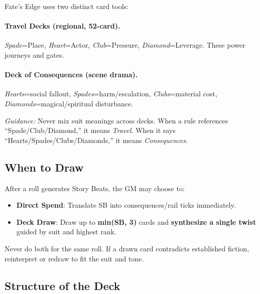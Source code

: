 Fate's Edge uses two distinct card tools:

\paragraph{Travel Decks (regional, 52-card).}
\emph{Spade}=Place, \emph{Heart}=Actor, \emph{Club}=Pressure, \emph{Diamond}=Leverage. These power journeys and gates.

\paragraph{Deck of Consequences (scene drama).}
\emph{Hearts}=social fallout, \emph{Spades}=harm/escalation, \emph{Clubs}=material cost, \emph{Diamonds}=magical/spiritual disturbance.

\textit{Guidance:} Never mix suit meanings across decks. When a rule references ``Spade/Club/Diamond,'' it means \emph{Travel}. When it says ``Hearts/Spades/Clubs/Diamonds,'' it means \emph{Consequences}.

\subsection*{When to Draw}

After a roll generates Story Beats, the GM may choose to:

\begin{itemize}
    \item \textbf{Direct Spend}: Translate SB into consequences/rail ticks immediately.
    \item \textbf{Deck Draw}: Draw up to \textbf{min(SB, 3)} cards and \textbf{synthesize a single twist} guided by suit and highest rank.
\end{itemize}

Never do both for the same roll. If a drawn card contradicts established fiction, reinterpret or redraw to fit the suit and tone.

\subsection*{Structure of the Deck}

